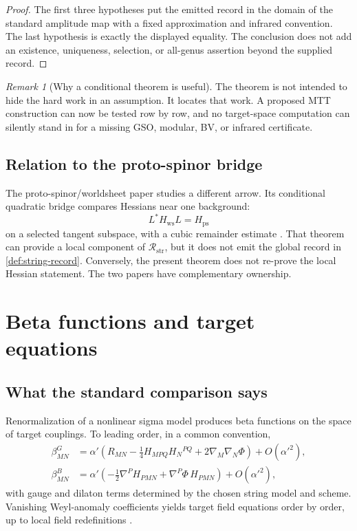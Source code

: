 \documentclass[11pt]{article}
\theoremstyle{definition}
\theoremstyle{remark}
\newtheorem{remark}[theorem]{Remark}
\newcommand{\cR}{\mathcal R}
\begin{document}
\begin{proof}
The first three hypotheses put the emitted record in the domain of the
standard amplitude map with a fixed approximation and infrared convention.
The last hypothesis is exactly the displayed equality.  The conclusion does
not add an existence, uniqueness, selection, or all-genus assertion beyond
the supplied record.
\end{proof}

\begin{remark}[Why a conditional theorem is useful]
The theorem is not intended to hide the hard work in an assumption.  It
locates that work.  A proposed MTT construction can now be tested row by row,
and no target-space computation can silently stand in for a missing GSO,
modular, BV, or infrared certificate.
\end{remark}

\subsection{Relation to the proto-spinor bridge}

The proto-spinor/worldsheet paper studies a different arrow.  Its conditional
quadratic bridge compares Hessians near one background:
\[
L^\ast H_{\mathrm{ws}}L=H_{\mathrm{ps}}
\]
on a selected tangent subspace, with a cubic remainder estimate
\cite{NeroProtoWorldsheet2026}.  That theorem can provide a local component
of \(\cR_{\mathrm{str}}\), but it does not emit the global record in
\cref{def:string-record}.  Conversely, the present theorem does not re-prove
the local Hessian statement.  The two papers have complementary ownership.

\section{Beta functions and target equations}
\label{sec:beta}

\subsection{What the standard comparison says}

Renormalization of a nonlinear sigma model produces beta functions on the
space of target couplings.  To leading order, in a common convention,
\begin{align}
\beta^G_{MN}
&=\alpha'\left(
R_{MN}-\frac14H_{MPQ}H_N{}^{PQ}
+2\nabla_M\nabla_N\Phi
\right)+O(\alpha'^2), \\
\beta^B_{MN}
&=\alpha'\left(
-\frac12\nabla^PH_{PMN}
+\nabla^P\Phi\,H_{PMN}
\right)+O(\alpha'^2),
\end{align}
with gauge and dilaton terms determined by the chosen string model and
scheme.  Vanishing Weyl-anomaly coefficients yields target field equations
order by order, up to local field redefinitions
\cite{Friedan1980,CallanEtAl1985,FradkinTseytlin1985}.
\end{document}
